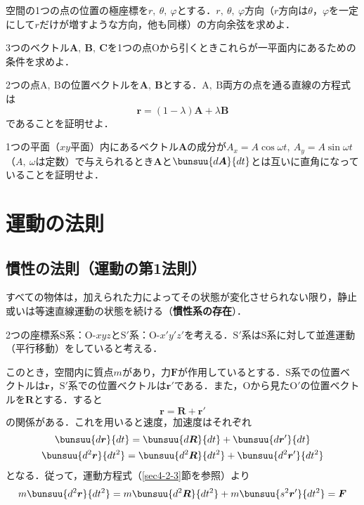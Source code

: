 \begin{enumerate}[label=\textbf{[\arabic*]}, labelsep=10pt, leftmargin=23pt]
	\item 空間の1つの点の位置の極座標を$r,\ \theta,\ \varphi$とする．$r,\ \theta,\ \varphi$方向（$r$方向は$\theta$，$\varphi$を一定にして$r$だけが増すような方向，他も同様）の方向余弦を求めよ．
	\item 3つのベクトル$\bm{A},\ \bm{B},\ \bm{C}$を1つの点$\mathrm{O}$から引くときこれらが一平面内にあるための条件を求めよ．
	\item 2つの点$\mathrm{A,\ B}$の位置ベクトルを$\bm{A},\ \bm{B}$とする．$\mathrm{A,\ B}$両方の点を通る直線の方程式は
	\begin{equation*}
		\bm{r} = (1 - \lambda)\bm{A} + \lambda\bm{B}
	\end{equation*}
	であることを証明せよ．
	\item 1つの平面（$xy$平面）内にあるベクトル$\bm{A}$の成分が$A_x = A\cos\omega t,\ A_y = A\sin \omega t$（$A,\ \omega$は定数）で与えられるとき$\bm{A}$と$\bunsuu{d\bm{A}}{dt}$とは互いに直角になっていることを証明せよ．
\end{enumerate}



\section{運動の法則}
\subsection{慣性の法則（運動の第1法則）}

\begin{tcolorbox}[colback=white]
	すべての物体は，加えられた力によってその状態が変化させられない限り，静止或いは等速直線運動の状態を続ける（\textbf{慣性系の存在}）．
\end{tcolorbox}

2つの座標系$\mathrm{S}$系：$\mathrm{O}\text{-}xyz$と$\mathrm{S'}$系：$\mathrm{O}\text{-}x'y'z'$を考える．$\mathrm{S'}$系は$\mathrm{S}$系に対して並進運動（平行移動）をしていると考える．

このとき，空間内に質点$m$があり，力$\bm{F}$が作用しているとする．$\mathrm{S}$系での位置ベクトルは$\bm{r}$，$\mathrm{S'}$系での位置ベクトルは$\bm{r}'$である．また，$\mathrm{O}$から見た$\mathrm{O'}$の位置ベクトルを$\bm{R}$とする．すると
\begin{equation}
	\bm{r} = \bm{R} + \bm{r}'
\end{equation}
の関係がある．これを用いると速度，加速度はそれぞれ
\begin{gather}
	\bunsuu{d\bm{r}}{dt} = \bunsuu{d\bm{R}}{dt} + \bunsuu{d\bm{r}'}{dt}\\
	\bunsuu{d^2\bm{r}}{dt^2} = \bunsuu{d^2\bm{R}}{dt^2} + \bunsuu{d^2\bm{r}'}{dt^2}
\end{gather}
となる．従って，運動方程式（\ref{sec4-2-3}節を参照）より
\begin{equation}
	m\bunsuu{d^2\bm{r}}{dt^2} = m\bunsuu{d^2\bm{R}}{dt^2} + m\bunsuu{s^2\bm{r}'}{dt^2} = \bm{F}
\end{equation}


